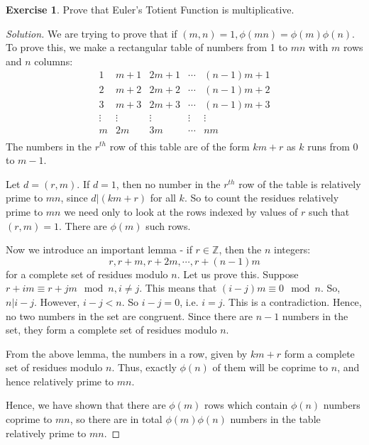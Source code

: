 \documentclass[12pt,letterpaper]{book}
\theoremstyle{definition}
\newtheorem*{exercise}{Exercise}
\newenvironment{solution}
  {\renewcommand\qedsymbol{$\blacksquare$}\begin{proof}[Solution]}
  {\end{proof}}
\newcommand{\Z}{\mathbb{Z}}
\begin{document}
\begin{exercise}
  Prove that Euler's Totient Function is multiplicative.
\end{exercise}
\begin{solution}
  We are trying to prove that if $(m,n) = 1, \phi(mn) = \phi(m) \phi(n)$. To prove this, we make a rectangular table of numbers from 1 to $mn$ with $m$ rows and $n$ columns:
  \[
  \begin{matrix}
    1 & m+1 & 2m+1 & \cdots & (n-1)m+1 \\
    2 & m+2 & 2m+2 & \cdots & (n-1)m+2 \\
    3 & m+3 & 2m+3 & \cdots & (n-1)m+3 \\
    \vdots & \vdots & \vdots & \vdots & \vdots \\
    m & 2m & 3m& \cdots & nm \\
  \end{matrix}
\]
  The numbers in the $r^{th}$ row of this table are of the form $km+r$ as $k$ runs from $0 $ to $m-1$.

  Let $d = (r,m)$. If $d = 1$, then no number in the $r^{th}$ row of the table is relatively prime to $mn$, since $d | (km+r)$ for all $k$. So to count the residues relatively prime to $mn$ we need only to look at the rows indexed by values of $r$ such that $(r,m) = 1$. There are $\phi(m)$ such rows.

  Now we introduce an important lemma - if $r \in \Z$, then the $n$ integers:
  \[r,r+m,r+2m,\cdots, r+(n-1)m\]
  for a complete set of residues modulo $n$. Let us prove this. Suppose $r+im \equiv r+jm \mod n, i \neq j$. This means that $(i-j)m \equiv 0 \mod n$. So, $n|i-j$. However, $i-j < n$. So $i-j = 0$, i.e. $i = j$. This is a contradiction. Hence, no two numbers in the set are congruent. Since there are $n-1$ numbers in the set, they form a complete set of residues modulo $n$.

  From the above lemma, the numbers in a row, given by $km+r$ form a complete set of residues modulo $n$. Thus, exactly $\phi(n)$ of them will be coprime to $n$, and hence relatively prime to $mn$.

  Hence, we have shown that there are $\phi(m)$ rows which contain $\phi(n)$ numbers coprime to $mn$, so there are in total $\phi(m) \phi(n)$ numbers in the table relatively prime to $mn$.
\end{solution}
\end{document}
